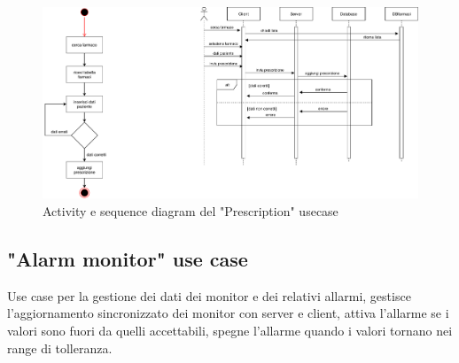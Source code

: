 \documentclass{article}
\begin{document}
\begin{figure}[H]

		\includegraphics[width=1.1\textwidth]{documenti/Diagrams_prescrizioni.pdf}
		\caption{Activity e sequence diagram del "Prescription" usecase}
		\label{Diagrams_prescrizioni}

	\end{figure}


\vspace{2cm}


\subsection{"Alarm monitor" use case}

Use case per la gestione dei dati dei monitor e dei relativi allarmi, gestisce l’aggiornamento sincronizzato dei monitor con server e client, attiva l’allarme se i valori sono fuori da quelli accettabili, spegne l’allarme quando i valori tornano nei range di tolleranza.

\vspace{1cm}
\end{document}
